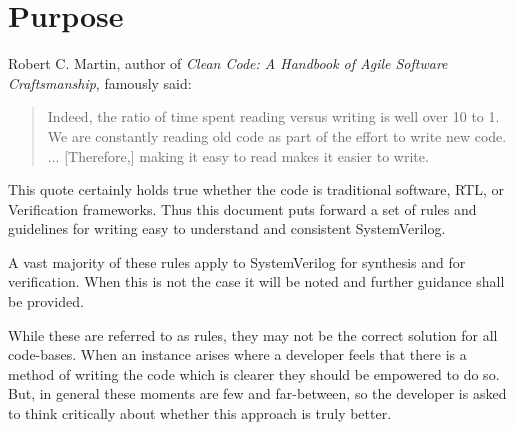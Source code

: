 \chapter{Purpose}

  Robert C. Martin, author of \textit{Clean Code: A Handbook of Agile Software Craftsmanship}, famously said:
  \begin{quote}
  Indeed, the ratio of time spent reading versus writing is well over 10 to 1.
  We are constantly reading old code as part of the effort to write new code. 
  ... [Therefore,] making it easy to read makes it easier to write.
  \end{quote}
  This quote certainly holds true whether the code is traditional software, RTL, or Verification frameworks.
  Thus this document puts forward a set of rules and guidelines for writing easy to understand and consistent SystemVerilog.

  A vast majority of these rules apply to SystemVerilog for synthesis and for verification.
  When this is not the case it will be noted and further guidance shall be provided.

  While these are referred to as rules, they may not be the correct solution for all code-bases.
  When an instance arises where a developer feels that there is a method of writing the code which is clearer they should be empowered to do so.
  But, in general these moments are few and far-between, so the developer is asked to think critically about whether this approach is truly better.